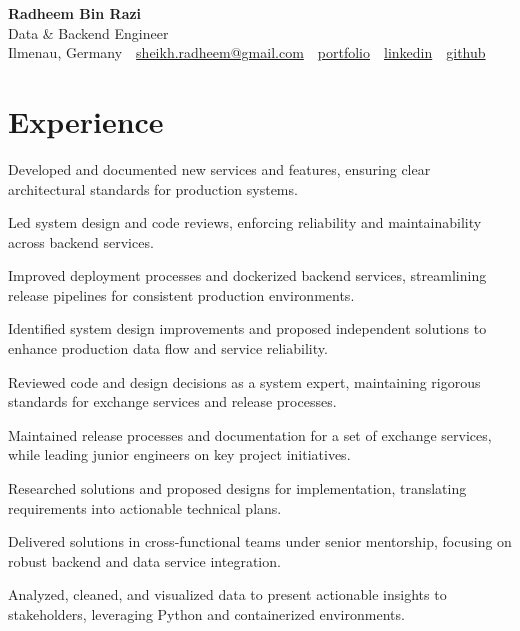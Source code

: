 \documentclass[11pt,a4paper]{resume}
\makeatletter
\newcommand{\Portfolio}{https://radheem.github.io/my-cv}
\newcommand{\PortfolioText}{portfolio}
\newcommand{\GitHub}{https://github.com/radheem}
\newcommand{\LinkedIn}{https://www.linkedin.com/in/radheem-razi}
\newcommand{\Email}{sheikh.radheem@gmail.com}
\makeatother
\begin{document}
\begin{center}
  {\huge\bfseries Radheem Bin Razi}\\[3pt]
  {\large Data \& Backend Engineer}\\[6pt]
  \small
  Ilmenau, Germany \,\textbar\,
  \href{mailto:\Email}{\Email} \,\textbar\,
  \href{\Portfolio}{\PortfolioText} \,\textbar\,
  \href{\LinkedIn}{linkedin} \,\textbar\,
  \href{\GitHub}{github}
\end{center}
\vspace{2pt}

\section{Experience}

\bullets
  \item Developed and documented new services and features, ensuring clear architectural standards for production systems.
  \item Led system design and code reviews, enforcing reliability and maintainability across backend services.
  \item Improved deployment processes and dockerized backend services, streamlining release pipelines for consistent production environments.
\bulletsend
\vspace{3pt}
\bullets
  \item Identified system design improvements and proposed independent solutions to enhance production data flow and service reliability.
  \item Reviewed code and design decisions as a system expert, maintaining rigorous standards for exchange services and release processes.
  \item Maintained release processes and documentation for a set of exchange services, while leading junior engineers on key project initiatives.
\bulletsend
\vspace{3pt}
\bullets
  \item Researched solutions and proposed designs for implementation, translating requirements into actionable technical plans.
  \item Delivered solutions in cross-functional teams under senior mentorship, focusing on robust backend and data service integration.
  \item Analyzed, cleaned, and visualized data to present actionable insights to stakeholders, leveraging Python and containerized environments.
\bulletsend
\vspace{3pt}
\end{document}

